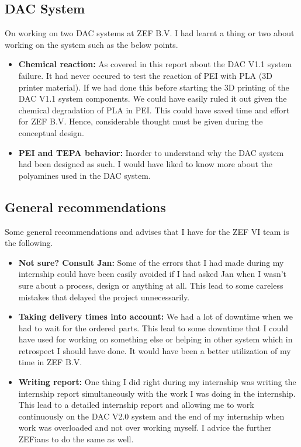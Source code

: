 \subsection{DAC System}

On working on two DAC systems at ZEF B.V. I had learnt a thing or two about working on the system such as the below points. 

\begin{itemize}
    \item \textbf{Chemical reaction: }As covered in this report about the DAC V1.1 system failure. It had never occured to test the reaction of PEI with PLA (3D printer material). If we had done this before starting the 3D printing of the DAC V1.1 system components. We could have easily ruled it out given the chemical degradation of PLA in PEI. This could have saved time and effort for ZEF B.V. Hence, considerable thought must be given during the conceptual design. 
    
    \item \textbf{PEI and TEPA behavior: }Inorder to understand why the DAC system had been designed as such. I would have liked to know more about the polyamines used in the DAC system. 
\end{itemize}

\subsection{General recommendations}

Some general recommendations and advises that I have for the ZEF VI team is the following. 

\begin{itemize}
    \item \textbf{Not sure? Consult Jan: }Some of the errors that I had made during my internship could have been easily avoided if I had asked Jan when I wasn't sure about a process, design or anything at all. This lead to some careless mistakes that delayed the project unnecessarily. 
    
    \item \textbf{Taking delivery times into account: }We had a lot of downtime when we had to wait for the ordered parts. This lead to some downtime that I could have used for working on something else or helping in other system which in retrospect I should have done. It would have been a better utilization of my time in ZEF B.V. 
    
    \item \textbf{Writing report: }One thing I did right during my internship was writing the internship report simultaneously with the work I was doing in the internship. This lead to a detailed internship report and allowing me to work continuously on the DAC V2.0 system and the end of my internship when work was overloaded and not over working myself. I advice the further ZEFians to do the same as well.   
\end{itemize}